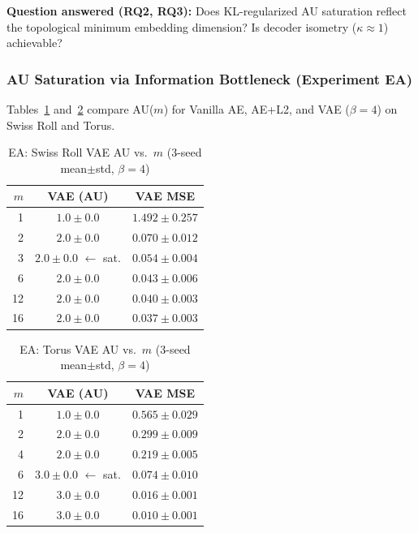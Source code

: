 \documentclass[lettersize,journal]{IEEEtran}
\newcommand{\kap}{\kappa}
\begin{document}
\textbf{Question answered (RQ2, RQ3):} Does KL-regularized AU saturation reflect the topological minimum embedding dimension? Is decoder isometry ($\kap \approx 1$) achievable?

\subsubsection{AU Saturation via Information Bottleneck (Experiment EA)}

Tables~\ref{tab:ea} and~\ref{tab:ea_torus} compare AU($m$) for Vanilla AE, AE+L2, and VAE ($\beta=4$) on Swiss Roll and Torus.

\begin{table}[!t]
\centering
\caption{EA: Swiss Roll VAE AU vs.\ $m$ (3-seed mean$\pm$std, $\beta=4$)}
\label{tab:ea}
\begin{tabular}{rcc}
\toprule
$m$ & VAE (AU) & VAE MSE \\
\midrule
1  & $1.0\pm0.0$ & $1.492\pm0.257$ \\
2  & $2.0\pm0.0$ & $0.070\pm0.012$ \\
3  & $\boldsymbol{2.0\pm0.0}$ $\leftarrow$ sat. & $0.054\pm0.004$ \\
6  & $\boldsymbol{2.0\pm0.0}$ & $0.043\pm0.006$ \\
12 & $\boldsymbol{2.0\pm0.0}$ & $0.040\pm0.003$ \\
16 & $\boldsymbol{2.0\pm0.0}$ & $0.037\pm0.003$ \\
\bottomrule
\end{tabular}
\end{table}

\begin{table}[!t]
\centering
\caption{EA: Torus VAE AU vs.\ $m$ (3-seed mean$\pm$std, $\beta=4$)}
\label{tab:ea_torus}
\begin{tabular}{rcc}
\toprule
$m$ & VAE (AU) & VAE MSE \\
\midrule
1  & $1.0\pm0.0$ & $0.565\pm0.029$ \\
2  & $2.0\pm0.0$ & $0.299\pm0.009$ \\
4  & $2.0\pm0.0$ & $0.219\pm0.005$ \\
6  & $\boldsymbol{3.0\pm0.0}$ $\leftarrow$ sat. & $0.074\pm0.010$ \\
12 & $\boldsymbol{3.0\pm0.0}$ & $0.016\pm0.001$ \\
16 & $\boldsymbol{3.0\pm0.0}$ & $0.010\pm0.001$ \\
\bottomrule
\end{tabular}
\end{table}
\end{document}
